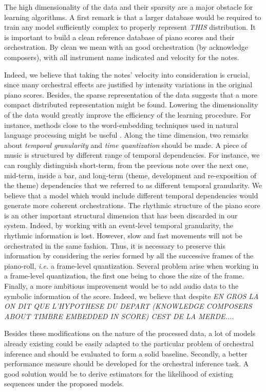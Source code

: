 \documentclass[letterpaper]{article}
\begin{document}
The high dimensionality of the data and their sparsity are a major obstacle for learning algorithms.
A first remark is that a larger database would be required to train any model sufficiently complex to properly represent \textit{THIS} distribution.
It is important to build a clean reference database of piano scores and their orchestration. By clean we mean with an good orchestration (by acknowledge composers), with all instrument name indicated and velocity for the notes. 

Indeed, we believe that taking the notes' velocity into consideration is crucial, since many orchestral effects are justified by intensity variations in the original piano scores. 
Besides, the sparse representation of the data suggests that a more compact distributed representation might be found. Lowering the dimensionality of the data would greatly improve the efficiency of the learning procedure. For instance, methods close to the word-embedding techniques used in natural language processing might be useful \cite{kiros2015skip}. 
Along the time dimension, two remarks about \textit{temporal granularity} and \textit{time quantization} should be made. A piece of music is structured by different range of temporal dependencies. For instance, we can roughly distinguish short-term, from the previous note over the next one, mid-term, inside a bar, and long-term (theme, development and re-exposition of the theme) dependencies that we referred to as different temporal granularity. We believe that a model which would include different temporal dependencies would generate more coherent orchestrations.
The rhythmic structure of the piano score is an other important structural dimension that has been discarded in our system. Indeed, by working with an event-level temporal granularity, the rhythmic information is lost. However, slow and fast movements will not be orchestrated in the same fashion. Thus, it is necessary to preserve this information by considering the series formed by all the successive frames of the piano-roll, \textit{i.e.} a frame-level quantization. Several problem arise when working in a frame-level quantization, the first one being to chose the size of the frame.
Finally, a more ambitious improvement would be to add audio data to the symbolic information of the score. Indeed, we believe that despite \textit{EN GROS LA ON DIT QUE L'HYPOTHESE DU DEPART (KNOWLEDGE COMPOSERS ABOUT TIMBRE EMBEDDED IN SCORE) CEST DE LA MERDE...}.

Besides these modifications on the nature of the processed data, a lot of models already existing could be easily adapted to the particular problem of orchestral inference and should be evaluated to form a solid baseline.
Secondly, a better performance measure should be developed for the orchestral inference task. A good solution would be to derive estimators for the likelihood of existing sequences under the proposed models.




\end{document}
